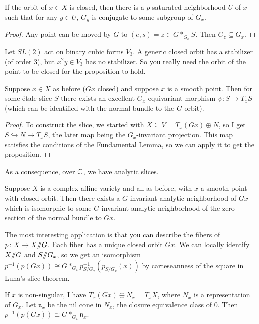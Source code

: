 \begin{proposition}
 If the orbit of $x\in X$ is closed, then there is a $p$-saturated neighborhood $U$ of $x$ such that for any $y\in U$, $G_y$ is conjugate to some subgroup of $G_x$.
\end{proposition}
\begin{proof}
 Any point can be moved by $G$ to $(e,s)=z\in G*_{G_x}S$. Then $G_z\subseteq G_x$.
\end{proof}
\begin{example}
 Let $SL(2)$ act on binary cubic forms $V_3$. A generic closed orbit has a stabilizer (of order 3), but $x^2y\in V_3$ has no stabilizer. So you really need the orbit of the point to be closed for the proposition to hold.
\end{example}
\begin{proposition}
 Suppose $x\in X$ as before ($Gx$ closed) and suppose $x$ is a smooth point. Then for some \'etale slice $S$ there exists an excellent $G_x$-equivariant morphism $\psi\colon S\to T_xS$ (which can be identified with the normal bundle to the $G$-orbit).
\end{proposition}
\begin{proof}
 To construct the slice, we started with $X\subseteq V=T_x(Gx)\oplus N$, so I get $S\hookrightarrow N\to T_xS$, the later map being the $G_x$-invariant projection. This map satisfies the conditions of the Fundamental Lemma, so we can apply it to get the proposition.
\end{proof}

As a consequence, over $\mathbb{C}$, we have analytic slices.
\begin{theorem}
 Suppose $X$ is a complex affine variety and all as before, with $x$ a smooth point with closed orbit. Then there exists a $G$-invariant analytic neighborhood of $Gx$ which is isomorphic to some $G$-invariant analytic neighborhood of the zero section of the normal bundle to $Gx$.
\end{theorem}

The most interesting application is that you can describe the fibers of $p\colon X\to X\mbox{\rm /\!\!/} G$. Each fiber has a unique closed orbit $Gx$. We can locally identify $X\mbox{\rm /\!\!/} G$ and $S\mbox{\rm /\!\!/} G_x$, so we get an isomorphism $p^{-1}(p(Gx))\cong G*_{G_x}p^{-1}_{S/G_x}(p_{S/G_x}(x))$ by carteseanness of the square in Luna's slice theorem.

\renewcommand{\n}{\mathfrak{n}}

If $x$ is non-singular, I have $T_x(Gx)\oplus N_x=T_xX$, where $N_x$ is a representation of $G_x$. Let $\n_x$ be the nil cone in $N_x$, the closure equivalence class of $0$. Then $p^{-1}(p(Gx))\cong G*_{G_x}\n_x$.


